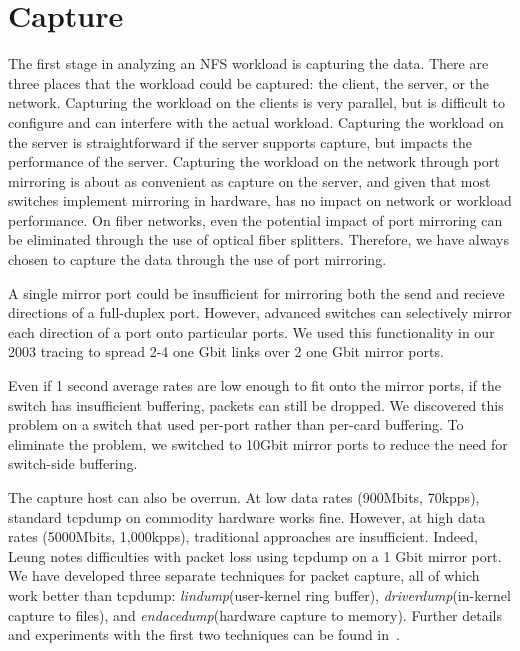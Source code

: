 \section{Capture}
\label{sec:capture}

The first stage in analyzing an NFS workload is capturing the data.
There are three places that the workload could be captured: the
client, the server, or the network.  Capturing the workload on the
clients is very parallel, but is difficult to configure and can
interfere with the actual workload.  Capturing the workload on the
server is straightforward if the server supports capture, 
but impacts the performance of the
server.  Capturing the workload on the network through port mirroring
is about as convenient as capture on the server, and given that most
switches implement mirroring in hardware, has no impact on network or
workload performance.  On fiber networks, even the potential impact of
port mirroring can be eliminated through the use of optical fiber
splitters. Therefore, we have always chosen to capture the
data through the use of port mirroring.

A single mirror port could be insufficient for mirroring both the send
and recieve directions of a full-duplex port.  However, advanced
switches can selectively mirror each direction of a port onto
particular ports.  We used this functionality in our 2003 tracing to
spread 2-4 one Gbit links over 2 one Gbit mirror ports.

Even if 1 second average rates are low enough to fit onto the mirror
ports, if the switch has insufficient buffering, packets can still be
dropped. We discovered this problem on a switch that used per-port
rather than per-card buffering.  To eliminate the problem, we switched
to 10Gbit mirror ports to reduce the need for switch-side buffering.

The capture host can also be overrun. At low data rates (900Mbits,
70kpps), standard tcpdump on commodity hardware works fine.
However, at high data rates (5000Mbits, 1,000kpps),
traditional approaches are insufficient. Indeed,
Leung\cite{LeungUsenix08} notes
difficulties with packet loss using tcpdump on a 1 Gbit mirror port.
We have developed three separate techniques for packet capture, all of
which work better than tcpdump: {\it lindump}(user-kernel ring
buffer), {\it driverdump}(in-kernel capture to files), and {\it
endacedump}(hardware capture to memory).  Further details and
experiments with the first two techniques can be found
in~\cite{Anderson06network-tracing}.

